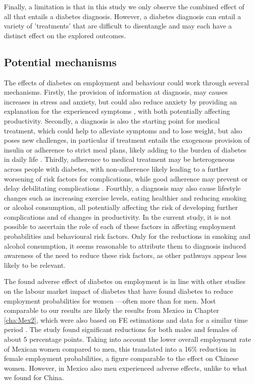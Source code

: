 Finally, a limitation is that in this study we only observe the combined effect of all that entails a diabetes diagnosis.  However, a diabetes diagnosis can entail a variety of 'treatments' that are difficult to disentangle and may each have a distinct effect on the explored outcomes. 

\subsection{Potential mechanisms}

The effects of diabetes on employment and behaviour could work through several mechanisms. Firstly, the provision of information at diagnosis, may causes increases in stress and anxiety, but could also reduce anxiety by providing an explanation for the experienced symptoms \parencite{Peel2004}, with both potentially affecting productivity. Secondly, a diagnosis is also the starting point for medical treatment, which could help to alleviate symptoms and to lose weight, but also poses new challenges, in particular if treatment entails the exogenous provision of insulin or adherence to strict meal plans, likely adding to the burden of diabetes in daily life \parencite{vijan2005,Pibernik-Okanovic1996}. Thirdly, adherence to medical treatment may be heterogeneous across people with diabetes, with non-adherence likely leading to a further worsening of risk factors for complications, while good adherence may prevent or delay debilitating complications \parencite{Asche2011}. Fourthly, a diagnosis may also cause lifestyle changes such as increasing exercise levels, eating healthier and reducing smoking or alcohol consumption, all potentially affecting the risk of developing further complications and of changes in productivity. In the current study, it is not possible to ascertain the role of each of these factors in affecting employment probabilities and behavioural risk factors. Only for the reductions in smoking and alcohol consumption, it seems reasonable to attribute them to diagnosis induced awareness of the need to reduce these risk factors, as other pathways appear less likely to be relevant. 

The found adverse effect of diabetes on employment is in line with other studies on the labour market impact of diabetes that have found diabetes to reduce employment probabilities for women \parencite{Minor2011,Latif2009,Harris2009,Seuring2016}---often more than for men. Most comparable to our results are likely the results from Mexico in Chapter \ref{cha:Mex2}, which were also based on \ac{FE} estimations and data for a similar time period \parencite{Seuring2016}. The study found significant reductions for both males and females of about 5 percentage points. Taking into account the lower overall employment rate of Mexican women compared to men, this translated into a 16\% reduction in female employment probabilities, a figure comparable to the effect on Chinese women. However, in Mexico also men experienced adverse effects, unlike to what we found for China.

